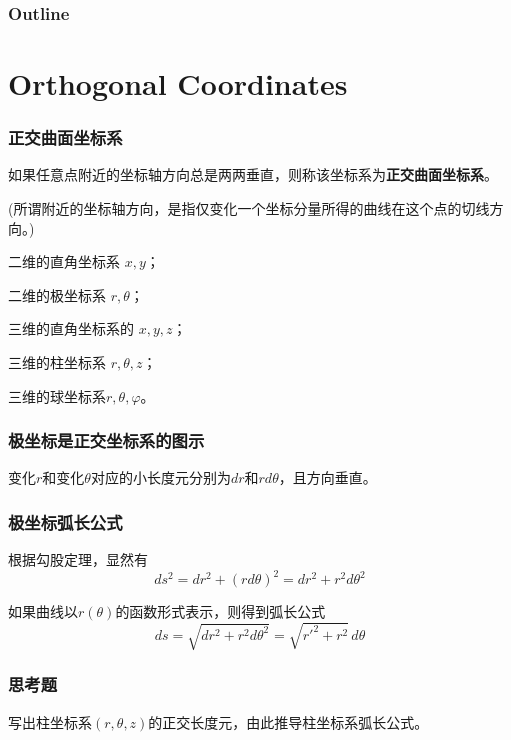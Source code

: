 \documentclass[CJK]{beamer}
\date{}
\begin{document}
  \bch
  

\begin{frame}
\frametitle{Outline}
\tableofcontents
\end{frame}


\section{Orthogonal Coordinates}



\begin{frame}
\frametitle{正交曲面坐标系}

如果任意点附近的坐标轴方向总是两两垂直，则称该坐标系为{\blue \bf 正交曲面坐标系}。

\skiplines
(所谓附近的坐标轴方向，是指仅变化一个坐标分量所得的曲线在这个点的切线方向。)

\skiplines
\bex
二维的直角坐标系 $x, y$；

二维的极坐标系 $r, \theta$；

三维的直角坐标系的 $x, y, z$；

三维的柱坐标系 $r, \theta, z$；

三维的球坐标系$ r, \theta, \varphi$。
\eex

\end{frame}


\begin{frame}
\frametitle{极坐标是正交坐标系的图示}


变化$r$和变化$\theta$对应的小长度元分别为$dr$和$rd\theta$，且方向垂直。

\end{frame}


\begin{frame}
\frametitle{极坐标弧长公式}

根据勾股定理，显然有
$$ds^2 = dr^2 + (rd\theta)^2  = dr^2 + r^2 d\theta^2$$
\emini
{}
\emini

如果曲线以$r(\theta)$的函数形式表示，则得到弧长公式
$$ ds = \sqrt{dr^2+r^2d\theta^2} = \sqrt{r'^2+r^2 }\,d\theta$$


\end{frame}


\begin{frame}
\frametitle{思考题}



写出柱坐标系$(r,\theta, z)$的正交长度元，由此推导柱坐标系弧长公式。


\end{frame}
\end{document}
